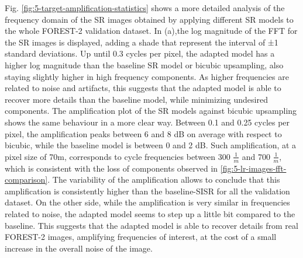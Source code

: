         Fig. \ref{fig:5-target-amplification-statistics} shows a more detailed analysis of the frequency domain of the SR images obtained by applying different SR models to the whole FOREST-2 validation dataset.
        In (a),the log magnitude of the FFT for the SR images is displayed, adding a shade that represent the interval of ±1 standard deviations. 
        Up until 0.3 cycles per pixel, the adapted model has a higher log magnitude than the baseline SR model or bicubic upsampling, also staying slightly higher in high frequency components.
        As higher frequencies are related to noise and artifacts, this suggests that the adapted model is able to recover more details than the baseline model, while minimizing undesired components.
        The amplification plot of the SR models against bicubic upsampling shows the same behaviour in a more clear way. Between 0.1 and 0.25 cycles per pixel, the amplification peaks  between 6 and 8 dB on average with respect to bicubic, while the baseline model is between 0 and 2 dB.
        Such amplification, at a pixel size of 70m, corresponds to cycle frequencies between  300 $\frac{1}{m}$ and 700 $\frac{1}{m}$, which is consistent with the loss of components observed in \ref{fig:5-lr-images-fft-comparison}.
        The variability of the amplification allows to conclude that this amplification is consistently higher than the baseline-SISR for all the validation dataset.
        On the other side, while the amplification is very similar in frequencies related to noise, the adapted model seems to step up a little bit compared to the baseline.  
        This suggests that the adapted model is able to recover details from real FOREST-2 images, amplifying frequencies of interest, at the cost of a small increase in the overall noise of the image.

